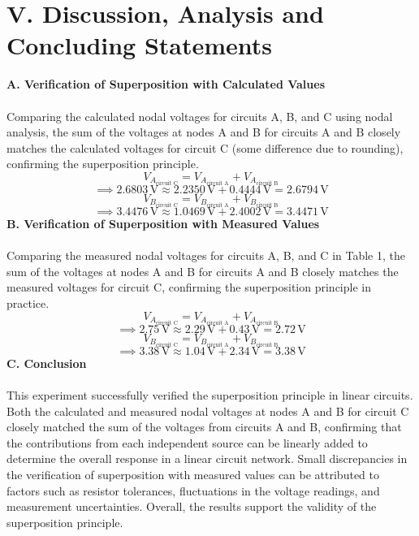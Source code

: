 \documentclass[12pt]{article}
\begin{document}
\section*{V. Discussion, Analysis and Concluding Statements}
\textbf{A. Verification of Superposition with Calculated Values}\\\\
Comparing the calculated nodal voltages for circuits A, B, and C using nodal analysis, the sum of the voltages at nodes A and B for circuits A and B closely matches the calculated voltages for circuit C (some difference due to rounding), confirming the superposition principle.
\[V_{A_\text{circuit C}} = V_{A_\text{circuit A}} + V_{A_\text{circuit B}}\]
\[\implies 2.6803\,\text{V} \approx 2.2350\,\text{V} + 0.4444\,\text{V}= 2.6794\,\text{V}\]
\[V_{B_\text{circuit C}} = V_{B_\text{circuit A}} + V_{B_\text{circuit B}}\]
\[\implies 3.4476\,\text{V} \approx 1.0469\,\text{V} + 2.4002\,\text{V}= 3.4471\,\text{V}\]
\textbf{B. Verification of Superposition with Measured Values}\\\\
Comparing the measured nodal voltages for circuits A, B, and C in Table 1, the sum of the voltages at nodes A and B for circuits A and B closely matches the measured voltages for circuit C, confirming the superposition principle in practice.
\[V_{A_\text{circuit C}} = V_{A_\text{circuit A}} + V_{A_\text{circuit B}}\]
\[\implies 2.75\,\text{V} \approx 2.29\,\text{V} + 0.43\,\text{V}= 2.72\,\text{V}\]
\[V_{B_\text{circuit C}} = V_{B_\text{circuit A}} + V_{B_\text{circuit B}}\]
\[\implies 3.38\,\text{V} \approx 1.04\,\text{V} + 2.34\,\text{V}= 3.38\,\text{V}\]
\textbf{C. Conclusion}\\\\
This experiment successfully verified the superposition principle in linear circuits. Both the calculated and measured nodal voltages at nodes A and B for circuit C closely matched the sum of the voltages from circuits A and B, confirming that the contributions from each independent source can be linearly added to determine the overall response in a linear circuit network. Small discrepancies in the verification of superposition with measured values can be attributed to factors such as resistor tolerances, fluctuations in the voltage readings, and measurement uncertainties. Overall, the results support the validity of the superposition principle.
\newpage
\end{document}
